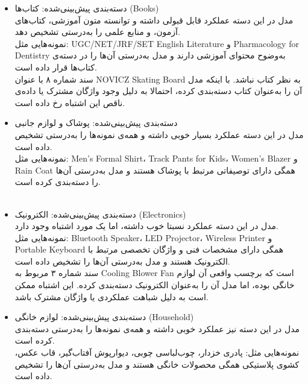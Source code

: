 \documentclass[a4paper,12pt]{article}
\begin{document}
\begin{itemize}
  \item دسته‌بندی پیش‌بینی‌شده: کتاب‌ها (Books)\\
مدل در این دسته عملکرد قابل قبولی داشته و توانسته متون آموزشی، کتاب‌های آزمون، و منابع علمی را به‌درستی تشخیص دهد.
\\
نمونه‌هایی مثل: UGC/NET/JRF/SET English Literature و Pharmacology for Dentistry به‌وضوح محتوای آموزشی دارند و مدل به‌درستی آن‌ها را در دسته‌ی کتاب‌ها قرار داده است.
\\
سند شماره ۸ با عنوان NOVICZ Skating Board به نظر کتاب نباشد. با اینکه مدل آن را به‌عنوان کتاب دسته‌بندی کرده، احتمالا به دلیل وجود واژگان مشترک یا داده‌ی ناقص این اشتباه رخ داده است.
\\
  \item دسته‌بندی پیش‌بینی‌شده: پوشاک و لوازم جانبی  \\
مدل در این دسته عملکرد بسیار خوبی داشته و همه‌ی نمونه‌ها را به‌درستی تشخیص داده است.
\\
نمونه‌هایی مثل: Men's Formal Shirt، Track Pants for Kids، Women's Blazer و Rain Coat همگی دارای توصیفاتی مرتبط با پوشاک هستند و مدل به‌درستی آن‌ها را دسته‌بندی کرده است.
\\\

  \item دسته‌بندی پیش‌بینی‌شده: الکترونیک (Electronics)\\
مدل در این دسته عملکرد نسبتا خوب داشته، اما یک مورد اشتباه وجود دارد.
\\
نمونه‌هایی مثل: Bluetooth Speaker، LED Projector، Wireless Printer و Portable Keyboard همگی دارای مشخصات فنی و واژگان تخصصی مرتبط با الکترونیک هستند و مدل به‌درستی آن‌ها را تشخیص داده است.
\\
سند شماره ۳ مربوط به Cooling Blower Fan است که برچسب واقعی آن لوازم خانگی بوده، اما مدل آن را به‌عنوان الکترونیک دسته‌بندی کرده. این اشتباه ممکن است به دلیل شباهت عملکردی یا واژگان مشترک باشد.
\\
  \item دسته‌بندی پیش‌بینی‌شده: لوازم خانگی (Household)\\
مدل در این دسته نیز عملکرد خوبی داشته و همه‌ی نمونه‌ها را به‌درستی دسته‌بندی کرده است.
\\
نمونه‌هایی مثل: پادری خزدار، چوب‌لباسی چوبی، دیوارپوش آفتاب‌گیر، قاب عکس، کشوی پلاستیکی همگی محصولات خانگی هستند و مدل به‌درستی آن‌ها را تشخیص داده است.

\end{itemize}
\end{document}
